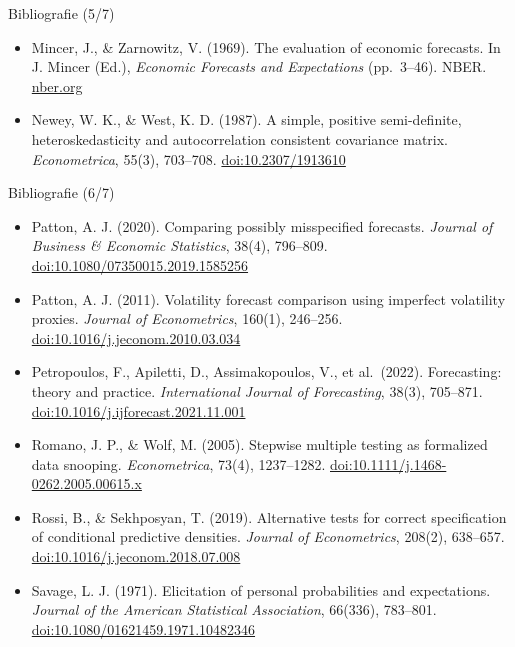 \begin{frame}{Bibliografie (5/7)}
\begin{itemize}
    \item Mincer, J., \& Zarnowitz, V. (1969). The evaluation of economic forecasts. In J. Mincer (Ed.), \textit{Economic Forecasts and Expectations} (pp.\ 3--46). NBER. \href{https://www.nber.org/books-and-chapters/economic-forecasts-and-expectations-analysis-forecasting-behavior-and-performance/evaluation-economic-forecasts}{nber.org}
    \item Newey, W. K., \& West, K. D. (1987). A simple, positive semi-definite, heteroskedasticity and autocorrelation consistent covariance matrix. \textit{Econometrica}, 55(3), 703--708. \href{https://doi.org/10.2307/1913610}{doi:10.2307/1913610}
\end{itemize}
\end{frame}

\begin{frame}{Bibliografie (6/7)}
\itemsize{\tiny}
\begin{itemize}
    \item Patton, A. J. (2020). Comparing possibly misspecified forecasts. \textit{Journal of Business \& Economic Statistics}, 38(4), 796--809. \href{https://doi.org/10.1080/07350015.2019.1585256}{doi:10.1080/07350015.2019.1585256}
    \item Patton, A. J. (2011). Volatility forecast comparison using imperfect volatility proxies. \textit{Journal of Econometrics}, 160(1), 246--256. \href{https://doi.org/10.1016/j.jeconom.2010.03.034}{doi:10.1016/j.jeconom.2010.03.034}
    \item Petropoulos, F., Apiletti, D., Assimakopoulos, V., et al.\ (2022). Forecasting: theory and practice. \textit{International Journal of Forecasting}, 38(3), 705--871. \href{https://doi.org/10.1016/j.ijforecast.2021.11.001}{doi:10.1016/j.ijforecast.2021.11.001}
    \item Romano, J. P., \& Wolf, M. (2005). Stepwise multiple testing as formalized data snooping. \textit{Econometrica}, 73(4), 1237--1282. \href{https://doi.org/10.1111/j.1468-0262.2005.00615.x}{doi:10.1111/j.1468-0262.2005.00615.x}
    \item Rossi, B., \& Sekhposyan, T. (2019). Alternative tests for correct specification of conditional predictive densities. \textit{Journal of Econometrics}, 208(2), 638--657. \href{https://doi.org/10.1016/j.jeconom.2018.07.008}{doi:10.1016/j.jeconom.2018.07.008}
    \item Savage, L. J. (1971). Elicitation of personal probabilities and expectations. \textit{Journal of the American Statistical Association}, 66(336), 783--801. \href{https://doi.org/10.1080/01621459.1971.10482346}{doi:10.1080/01621459.1971.10482346}

\end{itemize}
\end{frame}
